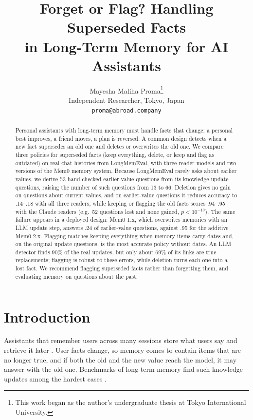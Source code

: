 \documentclass[11pt]{article}
\title{Forget or Flag? Handling Superseded Facts\\in Long-Term Memory for AI Assistants}
\author{Mayesha Maliha Proma\thanks{This work began as the author's undergraduate thesis at Tokyo International University.} \\
  Independent Researcher, Tokyo, Japan \\
  \texttt{proma@abroad.company}}
\begin{document}
\maketitle

\begin{abstract}
Personal assistants with long-term memory must handle facts that change: a personal best improves,
a friend moves, a plan is reversed. A common design detects when a new fact supersedes an old one and
deletes or overwrites the old one. We compare three policies for superseded facts (keep everything,
delete, or keep and flag as outdated) on real chat histories from LongMemEval, with three reader
models and two versions of the Mem0 memory system. Because LongMemEval rarely asks about earlier
values, we derive 53 hand-checked earlier-value questions from its knowledge-update questions, raising the number
of such questions from 13 to 66. Deletion gives no gain on questions about current values, and on
earlier-value questions it reduces accuracy to .14--.18 with all three readers, while keeping or
flagging the old facts scores .94--.95 with the Claude readers (e.g.\ 52 questions lost and none
gained, $p<10^{-10}$). The same failure appears in a deployed
design: Mem0 1.x, which overwrites memories with an LLM update step, answers .24 of earlier-value
questions, against .95 for the additive Mem0 2.x. Flagging matches keeping everything when memory
items carry dates and, on the original update questions, is the most accurate policy without dates. An LLM detector finds 90\% of the
real updates, but only about 69\% of its links are true replacements; flagging is robust to these
errors, while deletion turns each one into a lost fact. We recommend flagging
superseded facts rather than forgetting them, and evaluating memory on questions about the past.
\end{abstract}

\section{Introduction}

Assistants that remember users across many sessions store what users say and retrieve it later
\citep{packer2023memgpt,zhong2024memorybank,chhikara2025mem0}. User facts change, so memory comes to
contain items that are no longer true, and if both the old and the new value reach the model, it may
answer with the old one. Benchmarks of long-term memory find such knowledge updates among the
hardest cases \citep{wu2025longmemeval,hu2026memoryagentbench}.
\end{document}
